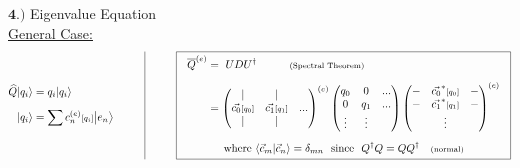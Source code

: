 \documentclass[12pt]{article}
\begin{document}
\newpage \noindent
\(\boldsymbol{4.)}\) Eigenvalue Equation\\[10pt]
\underline{General Case:}
\[
    \begin{aligned}
        \widehat{Q} | q_i \rangle &= q_i | q_i \rangle\\[5pt] 
        | q_i \rangle &= \sum c^{(e)}_n{\scriptstyle[q_i]} \big| e_n \big\rangle 
    \end{aligned}
    \hspace{1cm}
    \vline
    \hspace{1cm}
    \boxed{\begin{aligned}
        \ \ \overline{Q}^{(e)} &= \ U D U^{\dagger} \indent\indent \text{\scriptsize(Spectral Theorem)} \\[5pt]
        &= \left(\begin{matrix} 
                |   & |   &    \\
                \vec{c_0}{\scriptstyle[q_0]} & \vec{c_1}{\scriptstyle[q_1]} & ... \\
                |   & |   & 
            \end{matrix}\right)^{(e)}
            \left(\begin{matrix} 
                q_0   & 0         & ...\\
                0           & q_1 & ...\\
                \vdots      & \vdots    & 
            \end{matrix}\right)
            \left(\begin{matrix} 
                - & \vec{c_0}^*{\scriptstyle[q_0]}     & - \\
                - & \vec{c_1}^*{\scriptstyle[q_1]}     & - \\
                & \vdots  &  \\
            \end{matrix}\right)^{(e)} \ \ \\[5pt]
        & \indent \text{where } \langle \vec{c}_m | \vec{c}_n \rangle = \delta_{mn}
            \text{ \ since \ } Q^\dagger Q = QQ^\dagger \hspace{10pt} \text{\scriptsize(normal)}
    \end{aligned}}
\]
\end{document}
